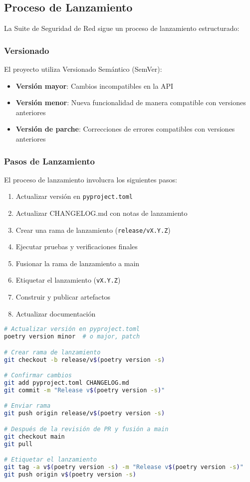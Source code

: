 \subsection{Proceso de Lanzamiento}
La Suite de Seguridad de Red sigue un proceso de lanzamiento estructurado:

\subsubsection{Versionado}
El proyecto utiliza Versionado Semántico (SemVer):

\begin{itemize}
    \item \textbf{Versión mayor}: Cambios incompatibles en la API
    \item \textbf{Versión menor}: Nueva funcionalidad de manera compatible con versiones anteriores
    \item \textbf{Versión de parche}: Correcciones de errores compatibles con versiones anteriores
\end{itemize}

\subsubsection{Pasos de Lanzamiento}
El proceso de lanzamiento involucra los siguientes pasos:

\begin{enumerate}
    \item Actualizar versión en \texttt{pyproject.toml}
    \item Actualizar CHANGELOG.md con notas de lanzamiento
    \item Crear una rama de lanzamiento (\texttt{release/vX.Y.Z})
    \item Ejecutar pruebas y verificaciones finales
    \item Fusionar la rama de lanzamiento a main
    \item Etiquetar el lanzamiento (\texttt{vX.Y.Z})
    \item Construir y publicar artefactos
    \item Actualizar documentación
\end{enumerate}

\begin{lstlisting}[language=bash, caption=Proceso de Lanzamiento]
# Actualizar versión en pyproject.toml
poetry version minor  # o major, patch

# Crear rama de lanzamiento
git checkout -b release/v$(poetry version -s)

# Confirmar cambios
git add pyproject.toml CHANGELOG.md
git commit -m "Release v$(poetry version -s)"

# Enviar rama
git push origin release/v$(poetry version -s)

# Después de la revisión de PR y fusión a main
git checkout main
git pull

# Etiquetar el lanzamiento
git tag -a v$(poetry version -s) -m "Release v$(poetry version -s)"
git push origin v$(poetry version -s)
\end{lstlisting}


